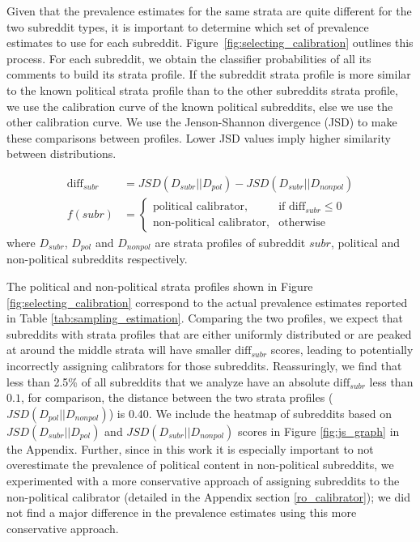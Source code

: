 \documentclass[letterpaper]{article} %
\begin{document}
Given that the prevalence estimates for the same strata are quite different for the two subreddit types, it is important to determine which set of prevalence estimates to use for each subreddit. Figure~\ref{fig:selecting_calibration} outlines this process. For each subreddit, we obtain the classifier probabilities of all its comments to build its strata profile. If the subreddit strata profile is more similar to the known political strata profile than to the other subreddits strata profile, we use the calibration curve of the known political subreddits, else we use the other calibration curve. We use the Jenson-Shannon divergence (JSD) to make these comparisons between profiles. Lower JSD values imply higher similarity between distributions.

\begin{align*}
\text{diff}_{subr} &= JSD(D_{subr}||D_{pol}) - JSD(D_{subr}||D_{nonpol})\\
 f(subr) &=
\begin{cases}
    \text{political calibrator},& \text{if } \text{diff}_{subr} \le 0 \\
    \text{non-political calibrator},  & \text{otherwise}
\end{cases}
\end{align*}
where $D_{subr}$, $D_{pol}$ and $D_{nonpol}$ are strata profiles of subreddit $subr$, political and non-political subreddits respectively.

The political and non-political strata profiles shown in Figure \ref{fig:selecting_calibration} correspond to the actual prevalence estimates reported in Table \ref{tab:sampling_estimation}. Comparing the two profiles, we expect that subreddits with strata profiles that are either uniformly distributed or are peaked at around the middle strata will have smaller $\text{diff}_{subr}$ scores, leading to potentially incorrectly assigning calibrators for those subreddits. Reassuringly, we find that less than 2.5\% of all subreddits that we analyze have an absolute $\text{diff}_{subr}$ less than $0.1$, for comparison, the distance between the two strata profiles ($JSD(D_{pol}||D_{nonpol})$) is 0.40. We include the heatmap of subreddits based on $JSD(D_{subr}||D_{pol})$ and $JSD(D_{subr}||D_{nonpol})$ scores in Figure \ref{fig:js_graph} in the Appendix. Further, since in this work it is especially important to not overestimate the prevalence of political content in non-political subreddits, we experimented with a more conservative approach of assigning subreddits to the non-political calibrator (detailed in the Appendix section \ref{ro_calibrator}); we did not find a major difference in the prevalence estimates using this more conservative approach.
\end{document}
